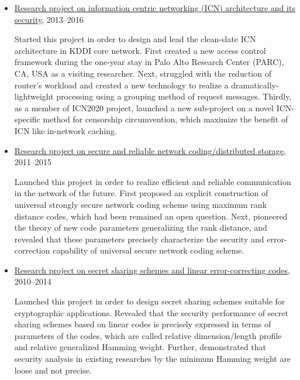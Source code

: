 \begin{itemize}
\item \hspace*{4ex}
\underline{Research project on information centric networking (ICN) architecture and its security},
2013--2016\\[0.5ex]
\hspace*{6ex}
\begin{minipage}{0.9\linewidth}
Started this project in order to design and lead the clean-slate ICN architecture in KDDI core network.
First created a new access control framework during the one-year stay in Palo Alto Research Center (PARC), CA, USA as a visiting researcher. Next, struggled with the reduction of router's workload and created a new technology to realize a dramatically-lightweight processing using a grouping method of request messages. Thirdly, as a member of ICN2020 project, launched a new sub-project on a novel ICN-specific method for censorship circumvention, which maximize the benefit of ICN like in-network caching.
\end{minipage}

\item \hspace*{4ex}
\underline{Research project on secure and reliable network coding/distributed storage},
2011--2015\\[0.5ex]
\hspace*{6ex}
\begin{minipage}{0.9\linewidth}
Launched this project in order to realize efficient and reliable communication
 in the network of the future.
First proposed an explicit construction of
 universal strongly secure network coding scheme using maximum rank
 distance codes, which had been remained an open question.
Next, pioneered the theory of new code parameters generalizing the rank distance, and revealed
that these parameters precisely characterize the security and
error-correction capability of universal secure network coding
scheme.
\end{minipage}

\item \hspace*{4ex}
\underline{Research project on secret sharing schemes and linear error-correcting codes},
2010--2014\\[0.5ex]
\hspace*{6ex}
\begin{minipage}{0.9\linewidth}
Launched this project in order to design secret sharing schemes suitable
 for cryptographic applications.
Revealed that the security performance of secret sharing schemes based
on linear codes is precisely expressed in terms of parameters of
 the codes, which are called relative dimension/length profile and
 relative generalized Hamming weight. Further, demonstrated that security analysis in existing
 researches by the minimum Hamming weight are loose and not precise.
\end{minipage}


\end{itemize}
